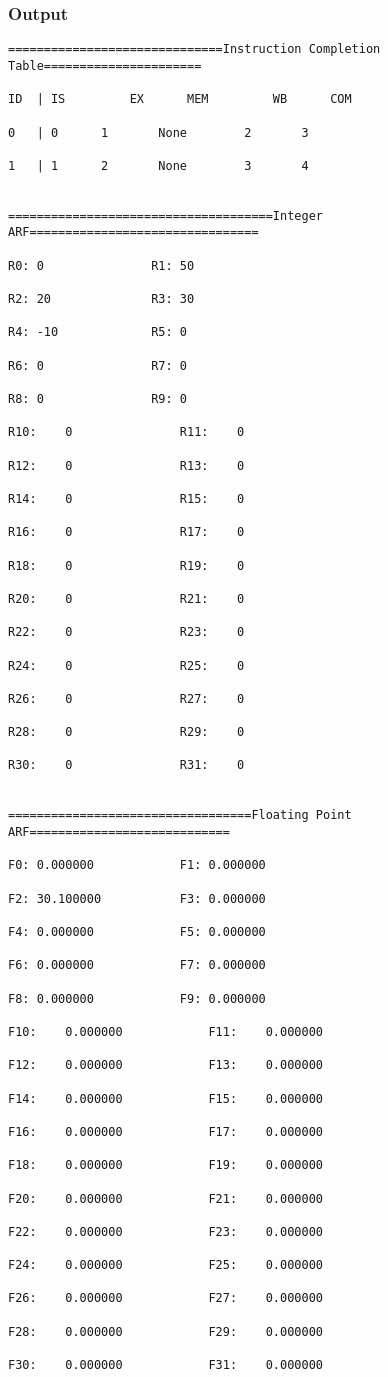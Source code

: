 \documentclass[12pt]{article}
\begin{document}
\subsubsection*{Output}
\begin{verbatim}
==============================Instruction Completion Table======================

ID	| IS		 EX		 MEM		 WB		 COM

0	| 0		 1		 None		 2		 3

1	| 1		 2		 None		 3		 4


=====================================Integer ARF================================

R0:	0				R1:	50

R2:	20				R3:	30

R4:	-10				R5:	0

R6:	0				R7:	0

R8:	0				R9:	0

R10:	0				R11:	0

R12:	0				R13:	0

R14:	0				R15:	0

R16:	0				R17:	0

R18:	0				R19:	0

R20:	0				R21:	0

R22:	0				R23:	0

R24:	0				R25:	0

R26:	0				R27:	0

R28:	0				R29:	0

R30:	0				R31:	0


==================================Floating Point ARF============================

F0:	0.000000			F1:	0.000000

F2:	30.100000			F3:	0.000000

F4:	0.000000			F5:	0.000000

F6:	0.000000			F7:	0.000000

F8:	0.000000			F9:	0.000000

F10:	0.000000			F11:	0.000000

F12:	0.000000			F13:	0.000000

F14:	0.000000			F15:	0.000000

F16:	0.000000			F17:	0.000000

F18:	0.000000			F19:	0.000000

F20:	0.000000			F21:	0.000000

F22:	0.000000			F23:	0.000000

F24:	0.000000			F25:	0.000000

F26:	0.000000			F27:	0.000000

F28:	0.000000			F29:	0.000000

F30:	0.000000			F31:	0.000000

\end{verbatim}
\end{document}
